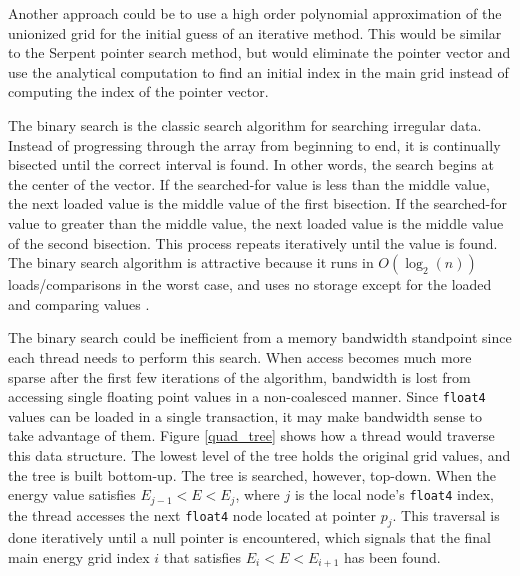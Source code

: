 Another approach could be to use a high order polynomial approximation of the unionized grid for the initial guess of an iterative method.  This would be similar to the Serpent pointer search method, but would eliminate the pointer vector and use the analytical computation to find an initial index in the main grid instead of computing the index of the pointer vector. 

The binary search is the classic search algorithm for searching irregular data.  Instead of progressing through the array from beginning to end, it is continually bisected until the correct interval is found.  In other words, the search begins at the center of the vector.  If the searched-for value is less than the middle value, the next loaded value is the middle value of the first bisection.  If the searched-for value to greater than the middle value, the next loaded value is the middle value of the second bisection.  This process repeats iteratively until the value is found.  The binary search algorithm is attractive because it runs in $O(\log_2(n))$ loads/comparisons in the worst case, and uses no storage except for the loaded and comparing values \cite{binary}.

The binary search could be inefficient from a memory bandwidth standpoint since each thread needs to perform this search.  When access becomes much more sparse after the first few iterations of the algorithm, bandwidth is lost from accessing single floating point values in a non-coalesced manner.  Since \lstinline{float4} values can be loaded in a single transaction, it may make bandwidth sense to take advantage of them.  Figure \ref{quad_tree} shows how a thread would traverse this data structure.  The lowest level of the tree holds the original grid values, and the tree is built bottom-up. The tree is searched, however, top-down. When the energy value satisfies $E_{j-1}<E<E_{j}$, where $j$ is the local node's \lstinline{float4} index, the thread accesses the next \lstinline{float4} node located at pointer $p_j$.  This traversal is done iteratively until a null pointer is encountered, which signals that the final main energy grid index $i$ that satisfies $E_{i}<E<E_{i+1}$ has been found.  %

